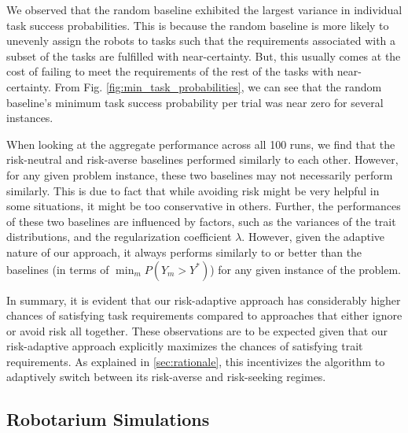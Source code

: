 \documentclass[letterpaper, 10 pt, conference]{ieeeconf}  %
\begin{document}
We observed that the random baseline exhibited the largest variance in individual task success probabilities. This is because the random baseline is more likely to unevenly assign the robots to tasks such that the requirements associated with a subset of the tasks are fulfilled with near-certainty. But, this usually comes at the cost of failing to meet the requirements of the rest of the tasks with near-certainty. From Fig. \ref{fig:min_task_probabilities}, we can see that the random baseline's minimum task success probability per trial was near zero for several instances. 

When looking at the aggregate performance across all 100 runs, we find that the risk-neutral and risk-averse baselines performed similarly to each other. However, for any given problem instance, these two baselines may not necessarily perform similarly. This is due to fact that while avoiding risk might be very helpful in some situations, it might be too conservative in others. Further, the performances of these two baselines are influenced by factors, such as the variances of the trait distributions, and the regularization coefficient $\lambda$. 
However, given the adaptive nature of our approach, it always performs similarly to or better than the baselines (in terms of $\min_m P(Y_m > Y^*)$) for any given instance of the problem. 

In summary, it is evident that our risk-adaptive approach has considerably higher chances of satisfying task requirements compared to approaches that either ignore or avoid risk all together. These observations are to be expected given that our risk-adaptive approach explicitly maximizes the chances of satisfying trait requirements. As explained in \ref{sec:rationale}, this incentivizes the algorithm to adaptively switch between its risk-averse and risk-seeking regimes. 


\subsection{Robotarium Simulations}
\end{document}
